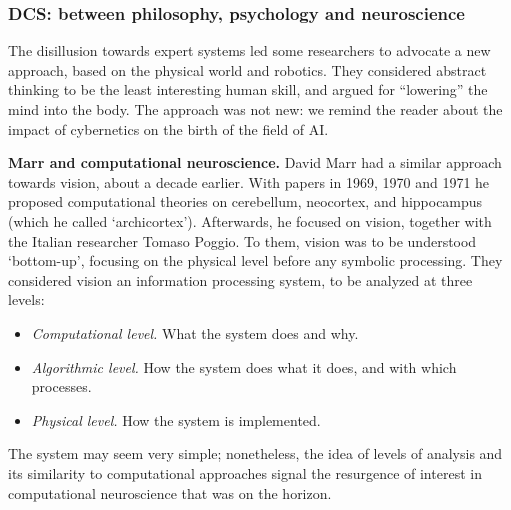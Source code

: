 \documentclass[../main.tex]{subfiles}
\begin{document}
\subsubsection{DCS: between philosophy, psychology and neuroscience}
The disillusion towards expert systems led some researchers to advocate a new approach, based on the physical world and robotics. They considered abstract thinking to be the least interesting human skill, and argued for ``lowering'' the mind into the body. The approach was not new: we remind the reader about the impact of cybernetics on the birth of the field of AI.

\vspace{4pt}
\textbf{Marr and computational neuroscience.} David Marr had a similar approach towards vision, about a decade earlier. With papers in 1969, 1970 and 1971 he proposed computational theories on cerebellum\cite{marrTheoryCerebellarCortex1969}, neocortex\cite{marrTheoryCerebralNeocortex1970}, and hippocampus (which he called `archicortex')\cite{marrSimpleMemoryTheory1971}. Afterwards, he focused on vision, together with the Italian researcher Tomaso Poggio. To them, vision was to be understood `bottom-up', focusing on the physical level before any symbolic processing. They considered vision an information processing system, to be analyzed at three levels\cite{marrUnderstandingComputationUnderstanding1976}:

\begin{itemize}
    \item \textit{Computational level.} What the system does and why.
    \item \textit{Algorithmic level.} How the system does what it does, and with which processes.
    \item \textit{Physical level.} How the system is implemented.
\end{itemize}

The system may seem very simple; nonetheless, the idea of levels of analysis and its similarity to computational approaches signal the resurgence of interest in computational neuroscience that was on the horizon.
\end{document}
